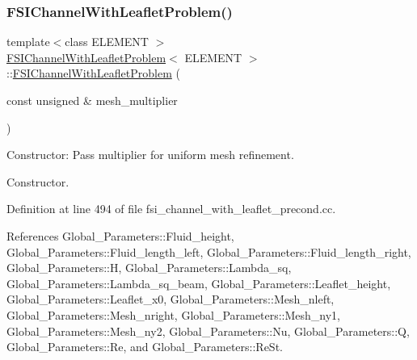 \subsubsection{\texorpdfstring{F\+S\+I\+Channel\+With\+Leaflet\+Problem()}{FSIChannelWithLeafletProblem()}}
{\footnotesize\ttfamily template$<$class E\+L\+E\+M\+E\+NT $>$ \\
\hyperlink{classFSIChannelWithLeafletProblem}{F\+S\+I\+Channel\+With\+Leaflet\+Problem}$<$ E\+L\+E\+M\+E\+NT $>$\+::\hyperlink{classFSIChannelWithLeafletProblem}{F\+S\+I\+Channel\+With\+Leaflet\+Problem} (\begin{DoxyParamCaption}\item[{const unsigned \&}]{mesh\+\_\+multiplier }\end{DoxyParamCaption})}



Constructor\+: Pass multiplier for uniform mesh refinement. 

Constructor. 

Definition at line 494 of file fsi\+\_\+channel\+\_\+with\+\_\+leaflet\+\_\+precond.\+cc.



References Global\+\_\+\+Parameters\+::\+Fluid\+\_\+height, Global\+\_\+\+Parameters\+::\+Fluid\+\_\+length\+\_\+left, Global\+\_\+\+Parameters\+::\+Fluid\+\_\+length\+\_\+right, Global\+\_\+\+Parameters\+::H, Global\+\_\+\+Parameters\+::\+Lambda\+\_\+sq, Global\+\_\+\+Parameters\+::\+Lambda\+\_\+sq\+\_\+beam, Global\+\_\+\+Parameters\+::\+Leaflet\+\_\+height, Global\+\_\+\+Parameters\+::\+Leaflet\+\_\+x0, Global\+\_\+\+Parameters\+::\+Mesh\+\_\+nleft, Global\+\_\+\+Parameters\+::\+Mesh\+\_\+nright, Global\+\_\+\+Parameters\+::\+Mesh\+\_\+ny1, Global\+\_\+\+Parameters\+::\+Mesh\+\_\+ny2, Global\+\_\+\+Parameters\+::\+Nu, Global\+\_\+\+Parameters\+::Q, Global\+\_\+\+Parameters\+::\+Re, and Global\+\_\+\+Parameters\+::\+Re\+St.

\mbox{\label{classFSIChannelWithLeafletProblem_a5df1d8f7229314a92ffb48ec61f56fe0}} 
